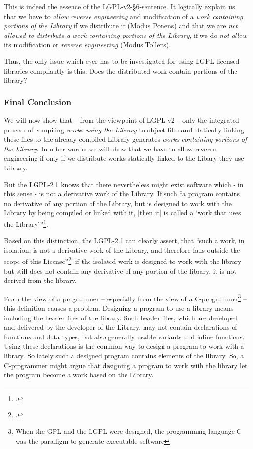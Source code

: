This is indeed the essence of the LGPL-v2-§6-sentence. It logically explain us
that we have to \emph{allow reverse engineering} and modification of a
\emph{work containing portions of the Library} if we distribute it (Modus
Ponens) and that we are \emph{not allowed to distribute a work containing portions of
the Library}, if we do \emph{not allow} its modification or \emph{reverse
engineering} (Modus Tollens).

Thus, the only issue which ever has to be investigated for using LGPL licensed
libraries compliantly is this: Does the distributed work contain portions of the
library?

\subsubsection{Final Conclusion}

We will now show that -- from the viewpoint of LGPL-v2 -- only the
integrated process of compiling \emph{works using the Library} to object files
and statically linking these files to the already compiled Library generates
\emph{works containing portions of the Library}. In other words: we will show
that we have to allow reverse engineering if only if we distribute works
statically linked to the Libary they use Library. 

But the LGPL-2.1 knows that there nevertheless might exist software which - in
this sense - is not a derivative work of the Library. If such \enquote{a
program contains no derivative of any portion of the Library, but is
designed to work with the Library by being compiled or linked with it, [then
it] is called a \enquote{work that uses the Library}}\footcite[cf.][\nopage wp
§5]{Lgpl21OsiLicense1999a}.

Based on this distinction, the LGPL-2.1 can clearly assert, that \enquote{such
a work, in isolation, is not a derivative work of the Library, and therefore
falls outside the scope of this License}\footcite[cf.][\nopage wp
§5]{Lgpl21OsiLicense1999a}: if the isolated work is designed to work with the
library but still does not contain any derivative of any portion of the library,
it is not derived from the library.

From the view of a programmer -- especially from the view of a
C-programmer\footnote{When the GPL and the LGPL were designed, the programming
language C was the paradigm to generate executable software} -- this definition
causes a problem. Designing a program to use a library means including the
header files of the library. Such header files, which are developed and
delivered by the developer of the Library, may not contain declarations of
functions and data types, but also generally usable variants and inline
functions. Using these declarations is the common way to design a program to
work with a library. So lately such a designed program contains elements of the
library. So, a C-programmer might argue that designing a program to work with
the library let the program become a work based on the Library.

